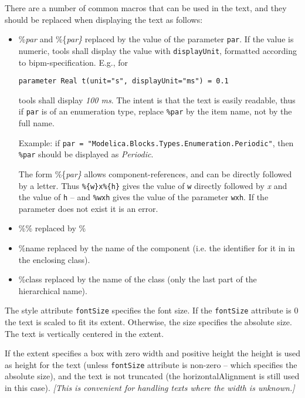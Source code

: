 There are a number of common macros that can be used in the text, and
they should be replaced when displaying the text as follows:

\begin{itemize}
\item
  \%\emph{par} and \%\{\emph{par\}} replaced by the value of the parameter \lstinline!par!.
  If the value is numeric, tools shall display the value with \lstinline!displayUnit!, formatted according to bipm-specification.
  E.g., for
\begin{lstlisting}[language=modelica]
parameter Real t(unit="s", displayUnit="ms") = 0.1
\end{lstlisting}
  tools shall display \emph{100 ms}.
  The intent is that the text is easily readable,
  thus if \lstinline!par! is of an enumeration type, replace \lstinline!%par! by the item name,
  not by the full name.
  \begin{nonnormative}
  Example: if \lstinline!par = "Modelica.Blocks.Types.Enumeration.Periodic"!,
  then \lstinline!%par! should be displayed as \emph{Periodic}.
  \end{nonnormative}
  The form \%\{\emph{par\}} allows component-references, and can be directly
  followed by a letter. Thus \lstinline!%{w}x%{h}! gives the value of \lstinline!w!
  directly followed by \emph{x} and the value of \lstinline!h! -- and \lstinline!%wxh! gives the value of the
  parameter \lstinline!wxh!. If the parameter does not exist it is an error.
\item
  \%\% replaced by \%
\item
  \%name replaced by the name of the component (i.e. the identifier for
  it in in the enclosing class).
\item
  \%class replaced by the name of the class (only the last part of the hierarchical name).
\end{itemize}

The style attribute \lstinline!fontSize! specifies the font size. If the \lstinline!fontSize!
attribute is 0 the text is scaled to fit its extent. Otherwise, the size
specifies the absolute size. The text is vertically centered in the
extent.

If the extent specifies a box with zero width and positive height the
height is used as height for the text (unless \lstinline!fontSize! attribute is
non-zero -- which specifies the absolute size), and the text is not
truncated (the horizontalAlignment is still used in this case).
\emph{{[}This is convenient for handling texts where the width is
unknown.{]}}

